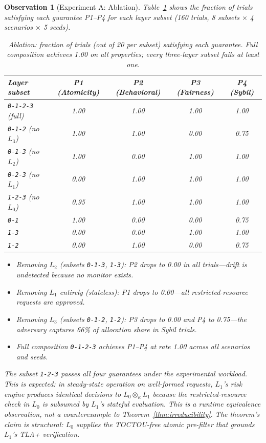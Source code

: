 \documentclass[11pt]{article}
\newtheorem{observation}[theorem]{Observation}
\newcommand{\Layer}[1]{L_{#1}}
\newcommand{\Comp}{\otimes_\kappa}
\begin{document}
\begin{observation}[Experiment A: Ablation]
\label{obs:exp-ablation}
Table~\ref{tab:ablation} shows the fraction of trials satisfying each guarantee P1--P4 for each layer subset (160 trials, 8 subsets $\times$ 4 scenarios $\times$ 5 seeds).

\begin{table}[H]
\centering
\small
\caption{Ablation: fraction of trials (out of 20 per subset) satisfying each guarantee. Full composition achieves 1.00 on all properties; every three-layer subset fails at least one.}
\label{tab:ablation}
\begin{tabular}{@{}lcccc@{}}
\toprule
\textbf{Layer subset} & \textbf{P1 (Atomicity)} & \textbf{P2 (Behavioral)} & \textbf{P3 (Fairness)} & \textbf{P4 (Sybil)} \\
\midrule
\texttt{0-1-2-3} (full)  & 1.00 & 1.00 & 1.00 & 1.00 \\
\texttt{0-1-2} (no $\Layer{3}$) & 1.00 & 1.00 & 0.00 & 0.75 \\
\texttt{0-1-3} (no $\Layer{2}$) & 1.00 & 0.00 & 1.00 & 1.00 \\
\texttt{0-2-3} (no $\Layer{1}$) & 0.00 & 1.00 & 1.00 & 1.00 \\
\texttt{1-2-3} (no $\Layer{0}$) & 0.95 & 1.00 & 1.00 & 1.00 \\
\texttt{0-1}                     & 1.00 & 0.00 & 0.00 & 0.75 \\
\texttt{1-3}                     & 0.00 & 0.00 & 1.00 & 1.00 \\
\texttt{1-2}                     & 0.00 & 1.00 & 0.00 & 0.75 \\
\bottomrule
\end{tabular}
\end{table}

\begin{itemize}[noitemsep]
  \item Removing $\Layer{2}$ (subsets \texttt{0-1-3}, \texttt{1-3}): P2 drops to 0.00 in all trials---drift is undetected because no monitor exists.
  \item Removing $\Layer{1}$ entirely (stateless): P1 drops to 0.00---all restricted-resource requests are approved.
  \item Removing $\Layer{3}$ (subsets \texttt{0-1-2}, \texttt{1-2}): P3 drops to 0.00 and P4 to 0.75---the adversary captures 66\% of allocation share in Sybil trials.
  \item Full composition \texttt{0-1-2-3} achieves P1--P4 at rate 1.00 across all scenarios and seeds.
\end{itemize}

The subset \texttt{1-2-3} passes all four guarantees under the experimental workload. This is expected: in steady-state operation on well-formed requests, $\Layer{1}$'s risk engine produces identical decisions to $\Layer{0} \Comp \Layer{1}$ because the restricted-resource check in $\Layer{0}$ is subsumed by $\Layer{1}$'s stateful evaluation. This is a \emph{runtime equivalence} observation, not a counterexample to Theorem~\ref{thm:irreducibility}. The theorem's claim is \emph{structural}: $\Layer{0}$ supplies the TOCTOU-free atomic pre-filter that grounds $\Layer{1}$'s TLA+ verification.
\end{observation}
\end{document}

